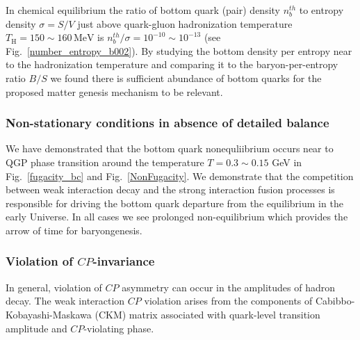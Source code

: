 In chemical equilibrium the ratio of bottom quark (pair) density $n_b^{th}$ to entropy density $\sigma=S/V$ just above quark-gluon hadronization temperature $T_\mathrm{H}=150\sim160\,\mathrm{MeV}$ is $n_b^{th}/\sigma=10^{-10}\sim10^{-13}$ (see Fig.~\ref{number_entropy_b002}). By studying the bottom density per entropy near to the hadronization temperature and comparing it to the baryon-per-entropy ratio $B/S$  we found there is sufficient abundance of bottom quarks for the proposed matter genesis mechanism to be relevant.


\subsubsection{Non-stationary conditions in absence of detailed balance}
We have demonstrated that the bottom quark nonequliibrium occurs near to QGP phase transition around the temperature $T=0.3\sim0.15$ GeV in Fig.~\ref{fugacity_bc} and Fig.~\ref{NonFugacity}. We demonstrate that the competition between weak interaction decay and the strong interaction fusion processes is responsible for driving the bottom quark departure from the equilibrium in the early Universe. In all cases we see prolonged non-equilibrium which provides the arrow of time for baryongenesis.


\subsubsection{Violation of $CP$-invariance}
In general, violation of $CP$ asymmetry can occur in the amplitudes of hadron decay. The weak interaction $CP$ violation arises from the components of Cabibbo-Kobayashi-Maskawa (CKM) matrix associated with quark-level transition amplitude and $CP$-violating phase.

